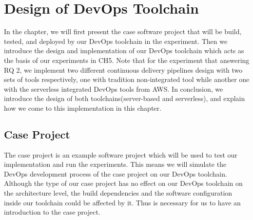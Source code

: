 \chapter{Design of DevOps Toolchain}
In the chapter, we will first present the case software project that will be build, tested, and deployed by our DevOps toolchain in the experiment. Then we introduce the design and implementation of our DevOps toolchain which acts as the basis of our experiments in CH5. Note that
for the experiment that answering RQ 2, we implement two different continuous delivery pipelines design with two sets of tools respectively, one with tradition non-integrated tool while another one with the serverless integrated DevOps tools from AWS. In conclusion, we introduce the design of both toolchains(server-based and serverless), and explain how we come to this implementation in this chapter. 
\section{Case Project}
The case project is an example software project which will be used to test our implementation and run the experiments. This means we will simulate the DevOps development process of the case project on our DevOps toolchain. Although the type of our case project has no effect on our DevOps toolchain on the architecture level, the build dependencies and the software configuration inside our toolchain could be affected by it. Thus is necessary for us to have an introduction to the case project.
